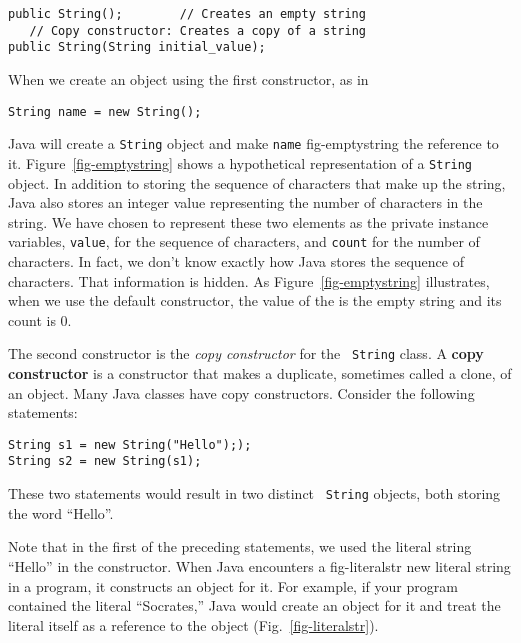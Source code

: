 \begin{jjjlisting}
\begin{lstlisting}
public String();        // Creates an empty string
   // Copy constructor: Creates a copy of a string
public String(String initial_value); 
\end{lstlisting}
\end{jjjlisting}

\noindent When we create an object using the first constructor, as in

\begin{jjjlisting}
\begin{lstlisting}
String name = new String();
\end{lstlisting}
\end{jjjlisting}

\noindent Java will create a {\tt String} object and make {\tt name}
{fig-emptystring}
the reference to it.  Figure~\ref{fig-emptystring} shows a hypothetical representation
of a {\tt String} object. In addition to storing the sequence of
characters that make up the string, Java also stores an integer value
representing the number of characters in the string.  We have chosen
to represent these two elements as the private instance variables,
{\tt value}, for the sequence of characters, and {\tt count} for the
number of characters. In fact, we don't know exactly how Java stores
the sequence of characters. That information is hidden. As Figure~\ref{fig-emptystring}
illustrates, when we use the default constructor, the value of the is
the empty string and its count is 0.


The second constructor is the {\em copy constructor} for the {\tt
String} class.  A {\bf copy constructor} is a constructor that makes a
duplicate, sometimes called a clone, of an object. Many Java classes
have copy constructors.  Consider the following statements:

\begin{jjjlisting}
\begin{lstlisting}
String s1 = new String("Hello"););
String s2 = new String(s1);
\end{lstlisting}
\end{jjjlisting}

\noindent These two statements would result in two distinct {\tt
String} objects, both storing the word ``Hello''.

Note that in the first of the preceding statements, we used the
literal string ``Hello'' in the constructor.  When Java encounters a
{fig-literalstr}
new literal string in a program, it constructs an object for it.  For
example, if your program contained the literal ``Socrates,'' Java
would create an object for it and treat the literal itself as a
reference to the object (Fig.~\ref{fig-literalstr}).

